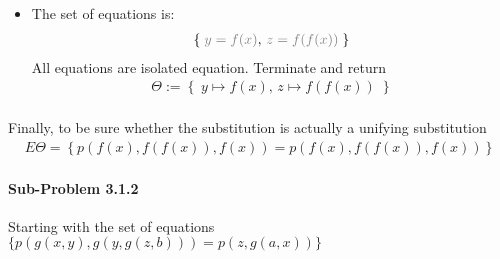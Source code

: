 \documentclass[11pt,a4paper]{article}
\begin{document}
\begin{itemize}
\item The set of equations is:
\begin{equation*}
\begin{split}
\left\lbrace  \; \textcolor{gray}{y = f(x)}, \, \textcolor{gray}{z=f(f(x))}\; \right\rbrace  \\
\end{split}
\end{equation*}
All equations are isolated equation. Terminate and return 
\begin{equation*}
\begin{split}
\Theta := \left\lbrace  \; y \mapsto f(x), \, z \mapsto f(f(x))\; \right\rbrace  \\
\end{split}
\end{equation*}
\end{itemize}

Finally, to be sure whether the substitution is actually a unifying substitution  
\begin{equation*}
\begin{split}
E \Theta = \left\lbrace  p(f (x), f (f(x)), f(x))= p(f(x), f(f(x)), f (x))  \right\rbrace 
\end{split}
\end{equation*}



\paragraph*{Sub-Problem 3.1.2} Starting with the set of equations $\{ p(g(x, y), g(y, g(z, b))) =p(z, g(a, x)) \}$
\end{document}
